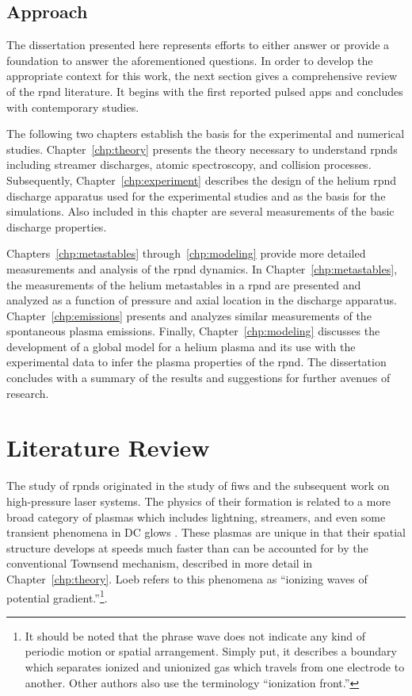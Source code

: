 \subsection{Approach}

The dissertation presented here represents efforts to either answer or provide a
foundation to answer the aforementioned questions. In order to develop the
appropriate context for this work, the next section gives a comprehensive review
of the \acs{rpnd} literature. It begins with the first reported pulsed
\acs{app}s and concludes with contemporary studies.

The following two chapters establish the basis for the experimental and
numerical studies. Chapter~\ref{chp:theory} presents the theory necessary to
understand \acs{rpnd}s including streamer discharges, atomic spectroscopy, and
collision processes. Subsequently, Chapter~\ref{chp:experiment} describes the
design of the helium \acs{rpnd} discharge apparatus used for the experimental
studies and as the basis for the simulations. Also included in this chapter are
several measurements of the basic discharge properties.

Chapters~\ref{chp:metastables} through~\ref{chp:modeling} provide more detailed
measurements and analysis of the \acs{rpnd} dynamics. In
Chapter~\ref{chp:metastables}, the measurements of the helium metastables in a
\acs{rpnd} are presented and analyzed as a function of pressure and axial
location in the discharge apparatus. Chapter~\ref{chp:emissions} presents and
analyzes similar measurements of the spontaneous plasma emissions. Finally,
Chapter~\ref{chp:modeling} discusses the development of a global model for a
helium plasma and its use with the experimental data to infer the plasma
properties of the \acs{rpnd}. The dissertation concludes with a summary of the
results and suggestions for further avenues of research.

\section{Literature Review}

The study of \acs{rpnd}s originated in the study of \acs{fiw}s and the
subsequent work on high-pressure laser systems. The physics of their formation
is related to a more broad category of plasmas which includes lightning,
streamers, and even some transient phenomena in DC glows \cite{Loeb1965}. These
plasmas are unique in that their spatial structure develops at speeds much
faster than can be accounted for by the conventional Townsend mechanism,
described in more detail in Chapter~\ref{chp:theory}. Loeb refers to this
phenomena as ``ionizing waves of potential gradient.''\footnote{It should be
noted that the phrase wave does not indicate any kind of periodic motion or
spatial arrangement. Simply put, it describes a boundary which separates ionized
and unionized gas which travels from one electrode to another. Other authors
also use the terminology ``ionization front.''}.

